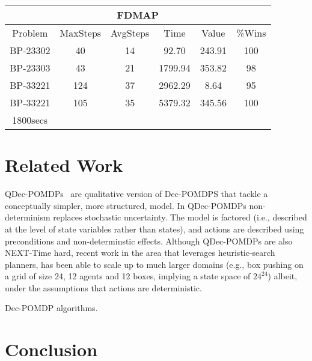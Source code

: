 \documentclass[letterpaper]{article} %
\theoremstyle{definition}
\begin{document}
\begin{center}
    \begin{tabular}{||c|c|c|c|c|c||}
         \hline
         \multicolumn{6}{||c||}{FDMAP}\\ 
         \hline
         Problem & MaxSteps & AvgSteps & Time & Value & \%Wins\\
         \hline
         BP-23302 & 40 & 14 & 92.70 & 243.91 & 100 \\
         \hline
         BP-23303 & 43 & 21 & 1799.94 & 353.82 & 98 \\
         \hline
         BP-33221 & 124 & 37 & 2962.29 & 8.64 & 95 \\
         \hline
         BP-33221 & 105 & 35 & 5379.32 & 345.56 & 100 \\
         1800secs  & & & & & \\
         \hline
    \end{tabular}
\end{center}
\section{Related Work}
QDec-POMDPs~\cite{QDECPOMDP} are qualitative version of Dec-POMDPS that tackle a conceptually simpler, more structured, model. In QDec-POMDPs 
non-determinism replaces stochastic uncertainty. The model is factored (i.e., described at the level of state variables rather than states), and actions 
are described using preconditions and non-determinstic effects. Although QDec-POMDPs are also NEXT-Time hard, recent work in the area that leverages heuristic-search planners, has been able to scale up to much larger domains (e.g., box pushing on a grid of size 24,  12 agents and 12 boxes, implying a state space of $24^{24}$)
albeit, under the assumptions that actions are deterministic.

Dec-POMDP algorithms.

\section{Conclusion}
\end{document}
